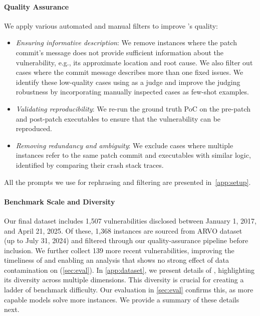\paragraph{Quality Assurance}
We apply various automated and manual filters to improve \sysname's quality:
\begin{itemize}[leftmargin=*,parsep=0pt,topsep=-3pt,itemsep=1pt]
    \item \emph{Ensuring informative description}: We remove instances where the patch commit's message does not provide sufficient information about the vulnerability, e.g., its approximate location and root cause. We also filter out cases where the commit message describes more than one fixed issues. We identify these low-quality cases using \gptiv as a judge and improve the judging robustness by incorporating manually inspected cases as few-shot examples.
    \item \emph{Validating reproducibility}: We re-run the ground truth PoC on the pre-patch and post-patch executables to ensure that the vulnerability can be reproduced.
    \item \emph{Removing redundancy and ambiguity}: We exclude cases where multiple instances refer to the same patch commit and executables with similar logic, identified by comparing their crash stack traces.
\end{itemize}

All the prompts we use for rephrasing and filtering are presented in~\cref{app:setup}.

\paragraph{Benchmark Scale and Diversity}

Our final dataset includes 1,507 vulnerabilities disclosed between January 1, 2017, and April 21, 2025.
Of these, 1,368 instances are sourced from ARVO dataset~\citep{mei2024arvo} (up to July 31, 2024) and filtered through our quality-assurance pipeline before inclusion.
We further collect 139 more recent vulnerabilities, improving the timeliness of \sysname and enabling an analysis that shows no strong effect of data contamination on \sysname (\cref{sec:eval}).
In \cref{app:dataset}, we present details of \sysname, highlighting its diversity across multiple dimensions.
This diversity is crucial for creating a ladder of benchmark difficulty.
Our evaluation in \cref{sec:eval} confirms this, as more capable models solve more \sysname instances.
We provide a summary of these details next.


